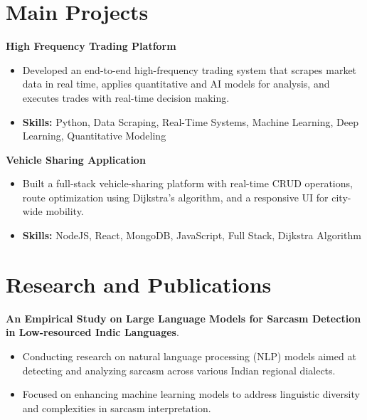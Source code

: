 \documentclass[a4paper,11pt]{article}
\begin{document}
\section{\textbf{Main Projects}}

\vspace{1mm}
  \textbf{High Frequency Trading Platform  }
\vspace{-1.5mm} %
\begin{itemize}
  \item Developed an end-to-end high-frequency trading system that scrapes market data in real time, applies quantitative and AI models for analysis, and executes trades with real-time decision making.
\vspace{-3mm}
  \item \textbf{Skills:} Python, Data Scraping, Real-Time Systems, Machine Learning, Deep Learning, Quantitative Modeling
\end{itemize}


\vspace{1mm}
   \textbf{Vehicle Sharing Application }
\vspace{-1.5mm} %
\begin{itemize}
  \item Built a full-stack vehicle-sharing platform with real-time CRUD operations, route optimization using Dijkstra's algorithm, and a responsive UI for city-wide mobility.
\vspace{-3mm}
  \item \textbf{Skills:} NodeJS, React, MongoDB, JavaScript, Full Stack, Dijkstra Algorithm
\end{itemize}



\section{\textbf{Research and Publications} \hfill }
\vspace{1mm}
  \textbf{An Empirical Study on Large Language Models for Sarcasm Detection in Low-resourced Indic Languages}.
\vspace{-1mm} %
\begin{itemize}
  \item Conducting research on natural language processing (NLP) models aimed at detecting and analyzing sarcasm across various Indian regional dialects.
\vspace{-3mm}
  \item Focused on enhancing machine learning models to address linguistic diversity and complexities in sarcasm interpretation.
\end{itemize}
\end{document}

